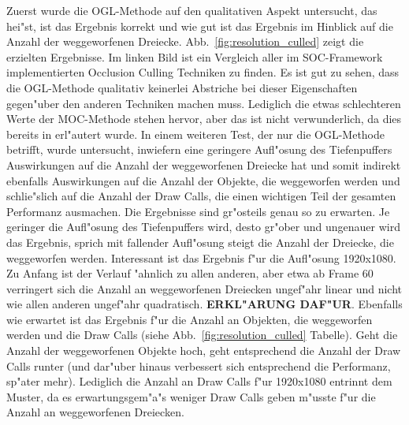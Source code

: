 \documentclass[journal]{vgtc}
\begin{document}
Zuerst wurde die OGL-Methode auf den qualitativen Aspekt untersucht, das hei"st, ist das Ergebnis korrekt und wie \glqq gut\grqq{} ist das Ergebnis im Hinblick auf die Anzahl der weggeworfenen Dreiecke.
Abb.\ \ref{fig:resolution_culled} zeigt die erzielten Ergebnisse.
Im linken Bild ist ein Vergleich aller im SOC-Framework implementierten Occlusion Culling Techniken zu finden.
Es ist gut zu sehen, dass die OGL-Methode qualitativ keinerlei Abstriche bei dieser Eigenschaften gegen"uber den anderen Techniken machen muss.
Lediglich die etwas schlechteren Werte der MOC-Methode stehen hervor, aber das ist nicht verwunderlich, da dies bereits in \cite{MSOC} erl"autert wurde.
In einem weiteren Test, der nur die OGL-Methode betrifft, wurde untersucht, inwiefern eine geringere Aufl"osung des Tiefenpuffers Auswirkungen auf die Anzahl der weggeworfenen Dreiecke hat und somit indirekt ebenfalls Auswirkungen auf die Anzahl der Objekte, die weggeworfen werden und schlie"slich auf die Anzahl der Draw Calls, die einen wichtigen Teil der gesamten Performanz ausmachen.
Die Ergebnisse sind gr"osteils genau so zu erwarten.
Je geringer die Aufl"osung des Tiefenpuffers wird, desto gr"ober und ungenauer wird das Ergebnis, sprich mit fallender Aufl"osung steigt die Anzahl der Dreiecke, die weggeworfen werden.
Interessant ist das Ergebnis f"ur die Aufl"osung 1920x1080.
Zu Anfang ist der Verlauf "ahnlich zu allen anderen, aber etwa ab Frame 60 verringert sich die Anzahl an weggeworfenen Dreiecken ungef"ahr linear und nicht wie allen anderen ungef"ahr quadratisch.
\textbf{ERKL"ARUNG DAF"UR}.
Ebenfalls wie erwartet ist das Ergebnis f"ur die Anzahl an Objekten, die weggeworfen werden und die Draw Calls (siehe Abb.\ \ref{fig:resolution_culled} Tabelle).
Geht die Anzahl der weggeworfenen Objekte hoch, geht entsprechend die Anzahl der Draw Calls runter (und dar"uber hinaus verbessert sich entsprechend die Performanz, sp"ater mehr).
Lediglich die Anzahl an Draw Calls f"ur 1920x1080 entrinnt dem Muster, da es erwartungsgem"a"s weniger Draw Calls geben m"usste f"ur die Anzahl an weggeworfenen Dreiecken.\\
\end{document}
